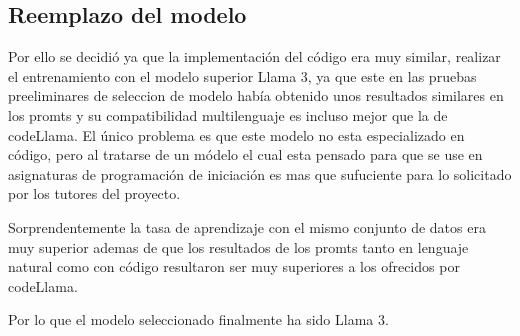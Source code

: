 \subsection{Reemplazo del modelo}

Por ello se decidió ya que la implementación del código era muy similar, realizar el entrenamiento con el modelo superior Llama 3, ya que este en las pruebas preeliminares de seleccion de modelo había obtenido unos resultados similares en los promts y su compatibilidad multilenguaje es incluso mejor que la de codeLlama. El único problema es que este modelo no esta especializado en código, pero al tratarse de un módelo el cual esta pensado para que se use en asignaturas de programación de iniciación es mas que sufuciente para lo solicitado por los tutores del proyecto.

Sorprendentemente la tasa de aprendizaje con el mismo conjunto de datos era muy superior ademas de que los resultados de los promts tanto en lenguaje natural como con código resultaron ser muy superiores a los ofrecidos por codeLlama.

Por lo que el modelo seleccionado finalmente ha sido Llama 3.



